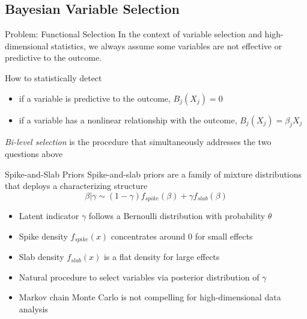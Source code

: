 \documentclass[
  ignorenonframetext,
  aspectratio=169]{beamer}
\providecommand{\tightlist}{%
  \setlength{\itemsep}{0pt}\setlength{\parskip}{0pt}}
\begin{document}
\hypertarget{bayesian-variable-selection}{%
\subsection{Bayesian Variable
Selection}\label{bayesian-variable-selection}}

\begin{frame}{Problem: Functional Selection}
\protect\hypertarget{problem-functional-selection}{}
In the context of variable selection and high-dimensional statistics, we
always assume some variables are not effective or predictive to the
outcome.

How to statistically detect

\begin{itemize}
\tightlist
\item
  if a variable is predictive to the outcome, \(B_j(X_j) = 0\)
\item
  if a variable has a nonlinear relationship with the outcome,
  \(B_j(X_j) = \beta_j X_j\)
\end{itemize}

\emph{Bi-level selection} is the procedure that simultaneously addresses
the two questions above
\end{frame}

\begin{frame}{Spike-and-Slab Priors}
\protect\hypertarget{spike-and-slab-priors}{}
Spike-and-slab priors are a family of mixture distributions that deploys
a characterizing structure
\[\beta|\gamma \sim (1-\gamma)f_{spike}(\beta) + \gamma f_{slab}(\beta)\]

\begin{itemize}
\item
  Latent indicator \(\gamma\) follows a Bernoulli distribution with
  probability \(\theta\)
\item
  Spike density \(f_{spike}(x)\) concentrates around 0 for small effects
\item
  Slab density \(f_{slab}(x)\) is a flat density for large effects
\item
  Natural procedure to select variables via posterior distribution of
  \(\gamma\)
\item
  Markov chain Monte Carlo is not compelling for high-dimensional data
  analysis
\end{itemize}
\end{frame}
\end{document}
